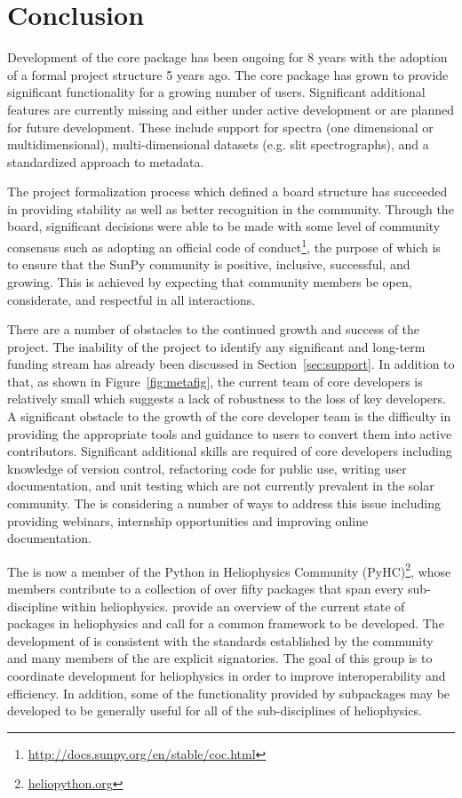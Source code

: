 \section{Conclusion}
\label{sec:conclusion}

Development of the \sunpypkg core package has been ongoing for 8 years with the adoption of a formal project structure 5 years ago.
The core package has grown to provide significant functionality for a growing number of users.
Significant additional features are currently missing and either under active development or are planned for future development.
These include support for spectra (one dimensional or multidimensional), multi-dimensional datasets (e.g. slit spectrographs), and a standardized approach to metadata.

The project formalization process which defined a board structure has succeeded in providing stability as well as better recognition in the community.
Through the board, significant decisions were able to be made with some level of community consensus such as adopting an official code of conduct\footnote{\url{http://docs.sunpy.org/en/stable/coc.html}}, the purpose of which is to ensure that the SunPy community is positive, inclusive, successful, and growing.
This is achieved by expecting that community members be open, considerate, and respectful in all interactions.

There are a number of obstacles to the continued growth and success of the project. The inability of the project to identify any significant and long-term funding stream has already been discussed in Section~\ref{sec:support}.
In addition to that, as shown in Figure~\ref{fig:metafig}, the current team of core developers is relatively small which suggests a lack of robustness to the loss of key developers.
A significant obstacle to the growth of the core developer team is the difficulty in providing the appropriate tools and guidance to users to convert them into active contributors.
Significant additional skills are required of core developers including knowledge of version control, refactoring code for public use, writing user documentation, and unit testing which are not currently prevalent in the solar community.
The \sunpyproj is considering a number of ways to address this issue including providing webinars, internship opportunities and improving online documentation.

The \sunpyproj is now a member of the Python in Heliophysics Community (PyHC)\footnote{\url{heliopython.org}}, whose members contribute to a collection of over fifty \python packages that span every sub-discipline within heliophysics.
\citet{snakes} provide an overview of the current state of \python packages in heliophysics and call for a common framework to be developed.
The development of \sunpypkg is consistent with the standards established by the community \citep{pyhcStandards} and many members of the \sunpyproj are explicit signatories.
The goal of this group is to coordinate \python development for heliophysics in order to improve interoperability and efficiency.
In addition, some of the functionality provided by \sunpypkg subpackages may be developed to be generally useful for all of the sub-disciplines of heliophysics.
